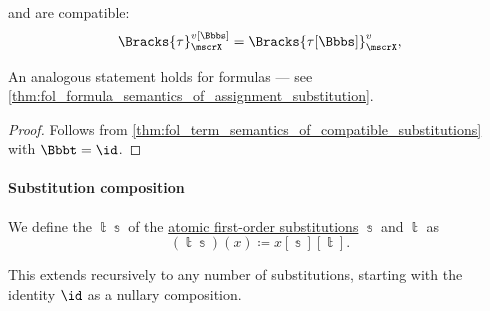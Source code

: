 \begin{corollary}\label{thm:fol_term_semantics_of_assignment_substitution}
   and  are compatible:
  \begin{equation}\label{eq:thm:fol_term_semantics_of_assignment_substitution}
    \Bracks{\tau}_\mscrX^{v[\Bbbs]} = \Bracks{\tau[\Bbbs]}_\mscrX^v,
  \end{equation}
\end{corollary}
\begin{comments}
  \item An analogous statement holds for formulas --- see \cref{thm:fol_formula_semantics_of_assignment_substitution}.
\end{comments}
\begin{proof}
  Follows from \cref{thm:fol_term_semantics_of_compatible_substitutions} with \( \Bbbt = \id \).
\end{proof}

\paragraph{Substitution composition}

\begin{definition}\label{def:fol_substitution_composition}
  We define the  \( \Bbbt\Bbbs \) of the \hyperref[def:atomic_fol_substitution]{atomic first-order substitutions} \( \Bbbs \) and \( \Bbbt \) as
  \begin{equation}\label{eq:def:fol_substitution_composition}
    (\Bbbt\Bbbs)(x) \coloneqq x[\Bbbs][\Bbbt].
  \end{equation}

  This extends recursively to any number of substitutions, starting with the identity \( \id \) as a nullary composition.
\end{definition}

